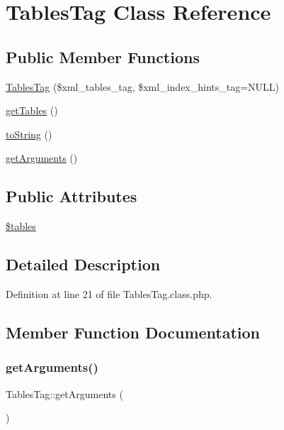\hypertarget{classTablesTag}{}\section{Tables\+Tag Class Reference}
\label{classTablesTag}
\subsection*{Public Member Functions}
\begin{DoxyCompactItemize}
\item 
\hyperlink{classTablesTag_a0ea7e51af16f15385a10c8f0984168d1}{Tables\+Tag} (\$xml\+\_\+tables\+\_\+tag, \$xml\+\_\+index\+\_\+hints\+\_\+tag=N\+U\+LL)
\item 
\hyperlink{classTablesTag_a7df694e7322df714e37c2c150c472bf5}{get\+Tables} ()
\item 
\hyperlink{classTablesTag_a01ef1da6c0c67a0b89a5174d44272ff9}{to\+String} ()
\item 
\hyperlink{classTablesTag_a6398e51952c21a5e713499d61114492a}{get\+Arguments} ()
\end{DoxyCompactItemize}
\subsection*{Public Attributes}
\begin{DoxyCompactItemize}
\item 
\hyperlink{classTablesTag_ad37e049d751434627d0ae2e1eb9d431a}{\$tables}
\end{DoxyCompactItemize}


\subsection{Detailed Description}


Definition at line 21 of file Tables\+Tag.\+class.\+php.



\subsection{Member Function Documentation}
\hypertarget{classTablesTag_a6398e51952c21a5e713499d61114492a}{}\label{classTablesTag_a6398e51952c21a5e713499d61114492a} 
\subsubsection{\texorpdfstring{get\+Arguments()}{getArguments()}}
{\footnotesize\ttfamily Tables\+Tag\+::get\+Arguments (\begin{DoxyParamCaption}{ }\end{DoxyParamCaption})}



